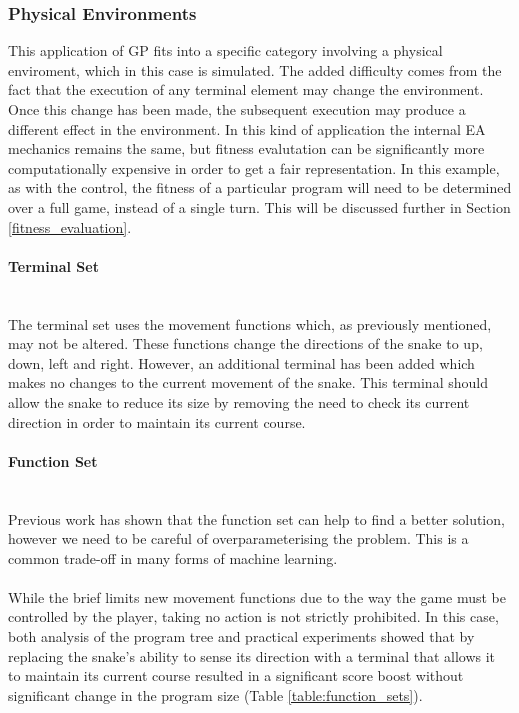 \documentclass[12pt]{article}
\newcommand{\myparagraph}[1]{\paragraph{#1}\mbox{}\\}
\begin{document}
\subsubsection{Physical Environments}
This application of GP fits into a specific category involving a physical enviroment, which in this case is simulated. The added difficulty comes from the fact that the execution of any terminal element may change the environment. Once this change has been made, the subsequent execution may produce a different effect in the environment. In this kind of application the internal EA mechanics remains the same, but fitness evalutation can be significantly more computationally expensive\cite[p. 110]{textbook} in order to get a fair representation. In this example, as with the control, the fitness of a particular program will need to be determined over a full game, instead of a single turn. This will be discussed further in Section \ref{fitness_evaluation}.
\myparagraph{Terminal Set}
The terminal set uses the movement functions which, as previously mentioned, may not be altered. These functions change the directions of the snake to up, down, left and right. However, an additional terminal has been added which makes no changes to the current movement of the snake. This terminal should allow the snake to reduce its size by removing the need to check its current direction in order to maintain its current course.

\myparagraph{Function Set}
Previous work has shown that the function set can help to find a better solution, however we need to be careful of overparameterising the problem. %
This is a common trade-off in many forms of machine learning. 
\\\\
While the brief limits new movement functions due to the way the game must be controlled by the player, taking no action is not strictly prohibited. In this case, both analysis of the program tree and practical experiments showed that by replacing the snake's ability to sense its direction with a terminal that allows it to maintain its current course resulted in a significant score boost without significant change in the program size (Table \ref{table:function_sets}).
\end{document}
